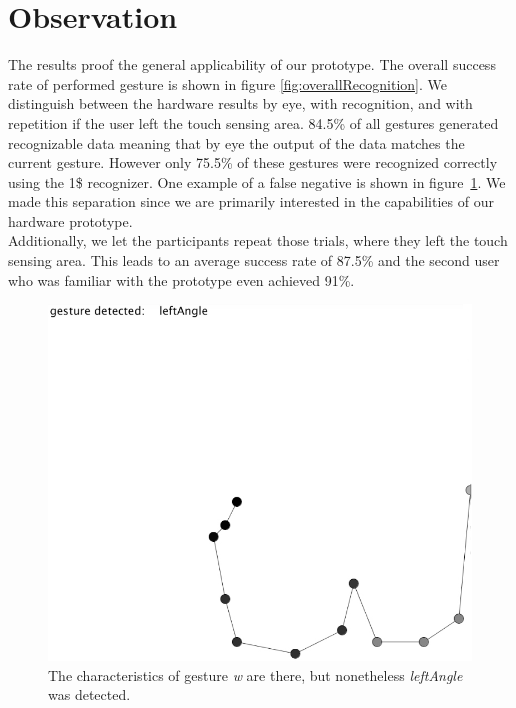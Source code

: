 \section{Observation}
The results proof the general applicability of our prototype. The overall success rate of performed gesture is shown in figure \ref{fig:overallRecognition}. We distinguish between the hardware results by eye, with recognition, and with repetition if the user left the touch sensing area. 84.5\% of all gestures generated recognizable data meaning that by eye the output of the data matches the current gesture. However only 75.5\% of these gestures were recognized correctly using the 1\$ recognizer.  One example of a false negative is shown in figure~\ref{fig:falsenegative}. We made this separation since we are primarily interested in the capabilities of our hardware prototype. \\
Additionally, we let the participants repeat those trials, where they  left the touch sensing area. This leads to an average success rate of 87.5\% and the second user who was familiar with the prototype even achieved 91\%.
\begin{figure}
\includegraphics[scale=0.35]{images/falsenegative.jpg}
\caption{The characteristics of gesture \emph{w} are there, but nonetheless \emph{leftAngle} was detected.}
\label{fig:falsenegative}
\end{figure}
